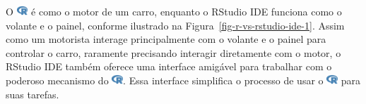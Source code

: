 \documentclass[
  letterpaper,
]{book}
\theoremstyle{plain}
\theoremstyle{definition}
\theoremstyle{remark}
\begin{document}
O
\includegraphics[width=1.13em,height=1em]{getting_started_with_r_files/figure-pdf/fa-icon-9b00320707d42527dde67262afb33ded.pdf}
é como o motor de um carro, enquanto o RStudio IDE funciona como o
volante e o painel, conforme ilustrado na
Figura~\ref{fig-r-vs-rstudio-ide-1}. Assim como um motorista interage
principalmente com o volante e o painel para controlar o carro,
raramente precisando interagir diretamente com o motor, o RStudio IDE
também oferece uma interface amigável para trabalhar com o poderoso
mecanismo do
\includegraphics[width=1.13em,height=1em]{getting_started_with_r_files/figure-pdf/fa-icon-9b00320707d42527dde67262afb33ded.pdf}.
Essa interface simplifica o processo de usar o
\includegraphics[width=1.13em,height=1em]{getting_started_with_r_files/figure-pdf/fa-icon-9b00320707d42527dde67262afb33ded.pdf}
para suas tarefas.
\end{document}
